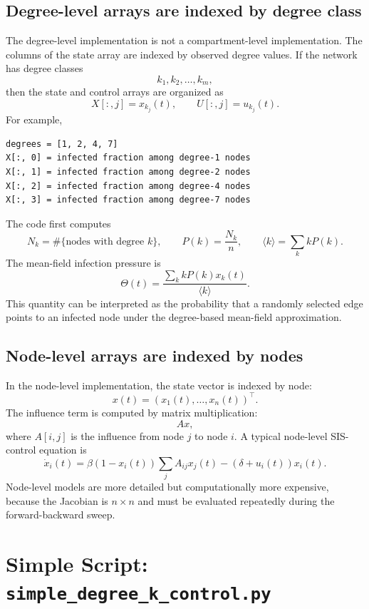 \documentclass[11pt,a4paper]{article}
\begin{document}
\subsection{Degree-level arrays are indexed by degree class}

The degree-level implementation is not a compartment-level implementation. The columns of the state array are indexed by observed degree values. If the network has degree classes
\[
  k_1,k_2,\ldots,k_m,
\]
then the state and control arrays are organized as
\[
  X[:,j] = x_{k_j}(t),
  \qquad
  U[:,j] = u_{k_j}(t).
\]
For example,

\begin{lstlisting}[style=text]
degrees = [1, 2, 4, 7]
X[:, 0] = infected fraction among degree-1 nodes
X[:, 1] = infected fraction among degree-2 nodes
X[:, 2] = infected fraction among degree-4 nodes
X[:, 3] = infected fraction among degree-7 nodes
\end{lstlisting}

The code first computes
\[
  N_k = \#\{\text{nodes with degree }k\},
  \qquad
  P(k)=\frac{N_k}{n},
  \qquad
  \langle k\rangle = \sum_k kP(k).
\]
The mean-field infection pressure is
\[
  \Theta(t)=\frac{\sum_k kP(k)x_k(t)}{\langle k\rangle}.
\]
This quantity can be interpreted as the probability that a randomly selected edge points to an infected node under the degree-based mean-field approximation.

\subsection{Node-level arrays are indexed by nodes}

In the node-level implementation, the state vector is indexed by node:
\[
  x(t)=(x_1(t),\ldots,x_n(t))^\top.
\]
The influence term is computed by matrix multiplication:
\[
  A x,
\]
where \(A[i,j]\) is the influence from node \(j\) to node \(i\). A typical node-level SIS-control equation is
\[
  \dot{x}_i(t)
  =\beta(1-x_i(t))\sum_j A_{ij}x_j(t)
  -(\delta+u_i(t))x_i(t).
\]
Node-level models are more detailed but computationally more expensive, because the Jacobian is \(n\times n\) and must be evaluated repeatedly during the forward-backward sweep.

\section[Simple Script: simple\_degree\_k\_control.py]{Simple Script: \texttt{simple\_degree\_k\_control.py}}
\end{document}

